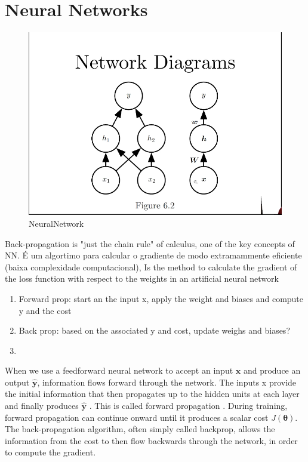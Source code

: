 
\section{Neural Networks}

\begin{figure}[H]
\centering
\caption{NeuralNetwork}
\includegraphics[scale=0.5]{Figures/network-diagram.PNG}
\end{figure}

Back-propagation is "just the chain rule" of calculus, one of the key concepts of NN. É um algortimo para calcular o gradiente de modo extramammente eficiente (baixa complexidade computacional), Is the method to calculate the gradient of the loss function with respect to the weights in an artificial neural network

\begin{enumerate}
    \item Forward prop: start an the input x, apply the weight and biases and compute y and the cost
    \item Back prop: based on the  associated y and cost, update weighs and biases?
    \item
\end{enumerate}

When we use a feedforward neural network to accept an input $\boldsymbol{x}$ and produce an
output $\hat{\boldsymbol{y}}$, information flows forward through the network. The inputs x provide
the initial information that then propagates up to the hidden units at each layer
and finally produces $\hat{\boldsymbol{y}}$ . This is called forward propagation . During training,
forward propagation can continue onward until it produces a scalar cost $J (\boldsymbol{\theta})$.
The back-propagation algorithm,  often simply called backprop, allows the information from the cost to then flow backwards through
the network, in order to compute the gradient.


